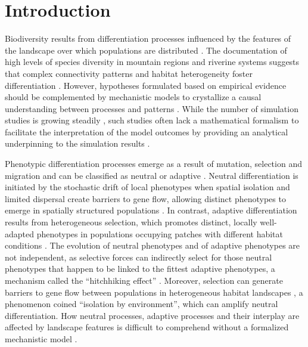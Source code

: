 \section{Introduction}  
Biodiversity results from differentiation processes influenced by the features of the landscape over which populations are distributed \citep{Hubbel2001}. The documentation of high levels of species diversity in mountain regions and riverine systems suggests that complex connectivity patterns and habitat heterogeneity foster differentiation \citep{Rahbek2019a,Ding2020a,Dias2014,Guegan1998}.
%
However, hypotheses formulated based on empirical evidence should be complemented by mechanistic models to crystallize a causal understanding between processes and patterns \citep{Levin2002}. While the number of simulation studies is growing steadily \citep{Cabral2017}, such studies often lack a mathematical formalism to facilitate the interpretation of the model outcomes by providing an analytical underpinning to the simulation results \citep{Lion2016}.

Phenotypic differentiation processes emerge as a result of mutation, selection and migration and can be classified as neutral or adaptive \citep{Holderegger2006}.
%
Neutral differentiation is initiated by the stochastic drift of local phenotypes when spatial isolation and limited dispersal create barriers to gene flow, allowing distinct phenotypes to emerge in spatially structured populations \citep{Slatkin1993a}.
%
In contrast, adaptive differentiation results from heterogeneous selection, which promotes distinct, locally well-adapted phenotypes in populations occupying patches with different habitat conditions \citep{Dieckmann1999}.
%
The evolution of neutral phenotypes and of adaptive phenotypes are not independent, as selective forces can indirectly select for those neutral phenotypes that happen to be linked to the fittest adaptive phenotypes, a mechanism called the “hitchhiking effect” \citep{Kaplan1989}. Moreover, selection can generate barriers to gene flow between populations in heterogeneous habitat landscapes \citep{Orsini2013,Wang2014}, a phenomenon coined “isolation by environment”, which can amplify neutral differentiation.
%
How neutral processes, adaptive processes and their interplay are affected by landscape features is difficult to comprehend without a formalized mechanistic model \citep{GARANT2007}.

